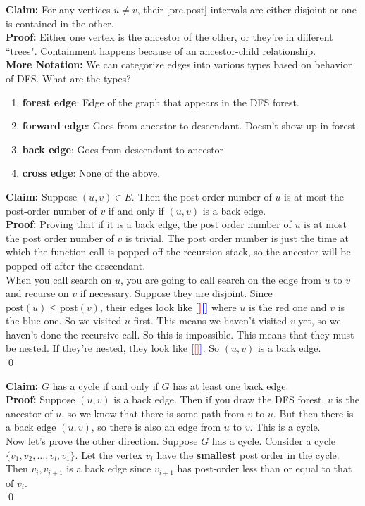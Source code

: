 \documentclass[12pt]{article}   	%
\begin{document}
\noindent
{\bf Claim: }For any vertices $u\ne v$, their [pre,post] intervals are either disjoint or one is contained in the other.\\

\noindent
{\bf Proof: }Either one vertex is the ancestor of the other,  or they're in different ``trees". Containment happens because of an ancestor-child relationship.\\

\noindent
{\bf More Notation: }We can categorize edges into various types based on behavior of DFS. What are the types?
\begin{enumerate}
\item {\bf forest edge}: Edge of the graph that appears in the DFS forest. 
\item {\bf forward edge}: Goes from ancestor to descendant. Doesn't show up in forest.
\item {\bf back edge}: Goes from descendant to ancestor
\item {\bf cross edge}: None of the above. 
\end{enumerate}

\noindent
{\bf Claim: }Suppose $(u,v) \in E$. Then the post-order number of $u$ is at most the post-order number of $v$ if and only if $(u,v)$ is a back edge.\\

\noindent
{\bf Proof: }Proving that if it is a back edge, the post order number of $u$ is at most the post order number of $v$ is trivial. The post order number is just the time at which the function call is popped off the recursion stack, so the ancestor will be popped off after the descendant. \\

\noindent
When you call search on $u$, you are going to call search on the edge from $u$ to $v$ and recurse on $v$ if necessary. Suppose they are disjoint. Since $\text{post}(u) \le \text{post}(v)$, their edges look like {\bf \textcolor{red}{[]}\textcolor{blue}{[]}} where $u$ is the red one and $v$ is the blue one. So we visited $u$ first. This means we haven't visited $v$ yet, so we haven't done the recursive call. So this is impossible. This means that they must be nested. If they're nested, they look like ${\bf \textcolor{blue}{[}\textcolor{red}{[}\textcolor{red}{]}\textcolor{blue}{]}}$. So $(u,v)$ is a back edge.\\
\qed

\noindent
{\bf Claim: }$G$ has a cycle if and only if $G$ has at least one back edge.\\

\noindent
{\bf Proof: }Suppose $(u,v)$ is a back edge. Then if you draw the DFS forest, $v$ is the ancestor of $u$, so we know that there is some path  from $v$ to $u$. But then there is a back edge $(u,v)$, so there is also an edge from $u$ to $v$. This is a cycle.\\

\noindent
Now let's prove the other direction. Suppose $G$ has a cycle. Consider a cycle $\{v_1,v_2,\ldots,v_l,v_1\}$. Let the vertex $v_i$ have the {\bf smallest} post order in the cycle. Then $v_i, v_{i+1}$ is a back edge since $v_{i+1}$ has post-order less than or equal to that of $v_i$.\\
\qed
\end{document}
